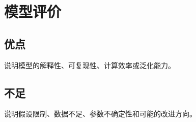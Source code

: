 \section{模型评价}

\subsection{优点}

说明模型的解释性、可复现性、计算效率或泛化能力。

\subsection{不足}

说明假设限制、数据不足、参数不确定性和可能的改进方向。

